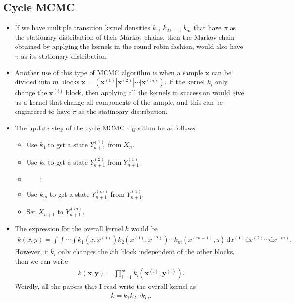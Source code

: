 \documentclass[10pt]{article}
\newcommand{\dee}{\mathrm{d}}
\newcommand{\ve}[1]{\mathbf{#1}}
\begin{document}
\subsection{Cycle MCMC}

\begin{itemize}
  \item If we have multiple transition kernel densities $k_1$, $k_2$, $\dotsc$, $k_m$ that have $\pi$ as the stationary distribution of their Markov chains, then the Markov chain obtained by applying the kernels in the round robin fashion, would also have $\pi$ as its stationary distribution.
  
  \item Another use of this type of MCMC algorithm is when a sample $\ve{x}$ can be divided into $m$ blocks $\ve{x} = (\ve{x}^{(1)} | \ve{x}^{(2)} | \dotsb | \ve{x}^{(m)})$. If the kernel $k_i$ only change the $\ve{x}^{(i)}$ block, then applying all the kernels in succession would give us a kernel that change all components of the sample, and this can be engineered to have $\pi$ as the statinoary distribution.
  
  \item The update step of the cycle MCMC algorithm be as follows:
  \begin{itemize}
    \item[] Use $k_1$ to get a state $Y^{(1)}_{n+1}$ from $X_n$.
    \item[] Use $k_2$ to get a state $Y^{(2)}_{n+1}$ from $Y^{(1)}_{n+1}$.
    \item[] $\qquad \vdots$
    \item[] Use $k_m$ to get a state $Y^{(m)}_{n+1}$ from $Y^{(1)}_{n+1}$. 
    \item[] Set $X_{n+1}$ to $Y^{(m)}_{n+1}$.
  \end{itemize}

  \item The expression for the overall kernel $k$ would be
  \begin{align*}
    k(x,y) = \int \int \dotsm \int k_1(x, x^{(1)})k_2(x^{(1)}, x^{(2)}) \dotsb k_m(x^{(m-1)}, y)\, \dee x^{(1)}\dee x^{(2)} \dotsm \dee x^{(m)}.
  \end{align*}
  However, if $k_i$ only changes the $i$th block independent of the other blocks, then we can write
  \begin{align*}
    k(\ve{x},\ve{y}) = \prod_{i=1}^m k_i(\ve{x}^{(i)},\ve{y}^{(i)}).
  \end{align*}
  Weirdly, all the papers that I read write the overall kernel as
  \begin{align*}
    k = k_1 k_2 \dotsb k_m.
  \end{align*}
\end{itemize}
\end{document}
